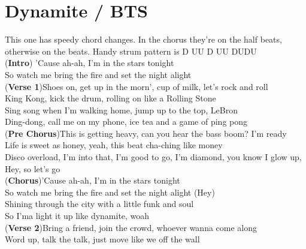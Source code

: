 \section{Dynamite / BTS}\label{sec:dynamite}

\BminorSeven
\Eminor
\Amajor
\DmajorEasy
\FsharpMinor
\Bmajor
\EmajorEasy

\small{This one has speedy chord changes. In the chorus they're on the half beats, otherwise on the beats. Handy strum pattern is D UU D UU DUDU}\\
(\textbf{Intro}) 'Cause ah-ah, I'm in the stars tonight  \\
So watch me bring the fire and set the night alight\\
(\textbf{Verse 1})Shoes on, get up in the morn', cup of milk, let's rock and roll\\
King Kong, kick the drum, rolling on like a Rolling Stone\\
Sing song when I'm walking home, jump up to the top, LeBron\\
Ding-dong, call me on my phone, ice tea and a game of ping pong\\
(\textbf{Pre Chorus})This is getting heavy, can you hear the bass boom? I'm ready\\
Life is sweet as honey, yeah, this beat cha-ching like money\\
Disco overload, I'm into that, I'm good to go, I'm diamond, you know I glow up, Hey, so let's go\\
(\textbf{Chorus})'Cause ah-ah, I'm in the stars tonight\\
So watch me bring the fire and set the night alight (Hey)\\
Shining through the city with a little funk and soul\\
So I'ma light it up like dynamite, woah\\
(\textbf{Verse 2})Bring a friend, join the crowd, whoever wanna come along\\
Word up, talk the talk, just move like we off the wall\\
